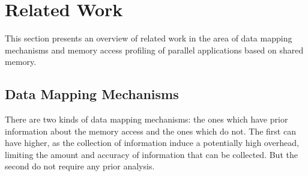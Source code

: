 
\section{Related Work}
\label{sec:soa}

This section presents an overview of related work in the area of data mapping mechanisms and memory access profiling of parallel applications based on shared memory.

\subsection{Data Mapping Mechanisms}
\label{sec:soa-mapping}

There are two kinds of data mapping mechanisms: the ones which have prior
information about the memory access and the ones which do not. The first can
have higher, as the collection of information induce a potentially high overhead, limiting the amount and accuracy of information that can be collected.
But the second do not require any prior analysis.
%
%    

